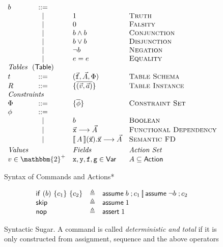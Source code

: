 \begin{figure}[ht]
\[\begin{array}{l c l l}
      b & ::= & \\
        & \mid & \TRUE & \textsc{Truth} \\
        & \mid & \FALSE & \textsc{Falsity} \\
        & \mid & b \wedge b & \textsc{Conjunction} \\
        & \mid & b \vee b & \textsc{Disjunction} \\
        & \mid & \neg b & \textsc{Negation} \\ 
        & \mid & e = e & \textsc{Equality} \\
      \multicolumn 4 l {\textit{Tables}~~(\Table)}\\
      t & ::= & (\vec{\var f}, \vec A, \Phi) & \textsc{Table Schema}\\
      R & ::= & \{\overline{(\vec v, \vec a)}\} & \textsc{Table Instance} \\      
      \multicolumn 4 l {\textit{Constraints}}\\
      \Phi & ::= &\{\overline{\phi} \} & \textsc{Constraint Set}\\
      \phi & ::= & \\
        & \mid & b & \textsc{Boolean} \\
        & \mid & \vec {\var x} \longrightarrow \vec A & \textsc{Functional Dependency}\\
        & \mid & \bracbb{A}(\vec{\var x}).\vec{\var x} \longrightarrow \vec A  & \textsc{Semantic FD} \\[.3em]
      \multicolumn{2}{l}{\textit{Values}} & \textit{Fields} & \textit{Action Set}\\
      \multicolumn{2}{l}{v \in \mathbbm{2}^+} & \var x, \var y, \var f, \var g \in \mathsf{Var} & A \subseteq \Action
    \end{array}\]
  \caption{Syntax of Commands and Actions*}
  \label{fig:syntax}
\end{figure}

\begin{figure}[ht]
  \[\begin{array}{lcl}
      \mathsf{if}~(b)~\{c_1\}~\{c_2\} & \triangleq & \mathsf{assume}\; b\;;c_1 \operatorname*{\left[\!\right]} \mathsf{assume}\; \neg b\;; c_2 \\
      \mathsf{skip} & \triangleq& \mathsf{assume}\; 1\; \\
      \mathsf{nop} & \triangleq & \mathsf{assert}\; 1\;
    \end{array}
  \]
  \caption{Syntactic Sugar. A command is called \emph{deterministic
      and total} if it is only constructed from assignment, sequence
    and the above operators}
  \label{fig:sugar}
\end{figure}

